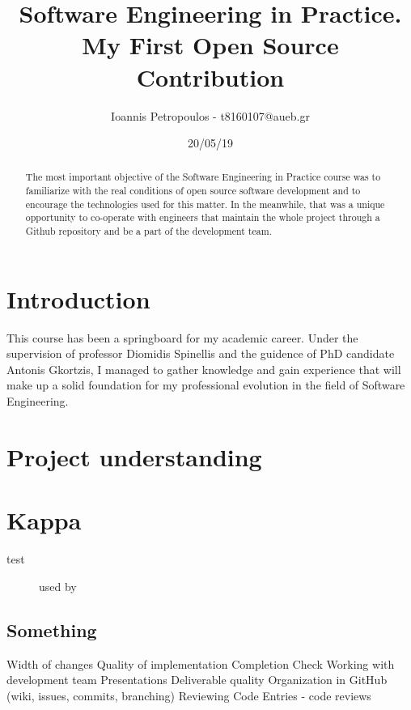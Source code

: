 \documentclass[12pt]{article}
\title{Software Engineering in Practice. My First Open Source Contribution}
\author{Ioannis Petropoulos - t8160107@aueb.gr}
\date{20/05/19}
\begin{document}
\maketitle

\begin{abstract}
  The most important objective of the Software Engineering in Practice course was to familiarize with the real conditions of open source software development and to encourage the technologies used for this matter. In the meanwhile, that was a unique opportunity to co-operate with engineers that maintain the whole project through a Github repository and be a part of the development team.  
	\end{abstract}

\section*{Introduction}
   This course has been a springboard for my academic career. Under the supervision of professor Diomidis Spinellis and the guidence of PhD candidate Antonis Gkortzis, I managed to gather knowledge and gain experience that will make up a solid foundation for my professional evolution in the field of Software Engineering.

\section{Project understanding}

\section{Kappa}
  test
  
\begin{figure}[tph!]
    \caption{used by}
    \label{fig:verticalcell}
\end{figure}

\subsection{Something}

    Width of changes
    Quality of implementation
    Completion
    Check
    Working with development team
    Presentations
    Deliverable quality
    Organization in GitHub (wiki, issues, commits, branching)
    Reviewing Code Entries - code reviews
  
\end{document}

